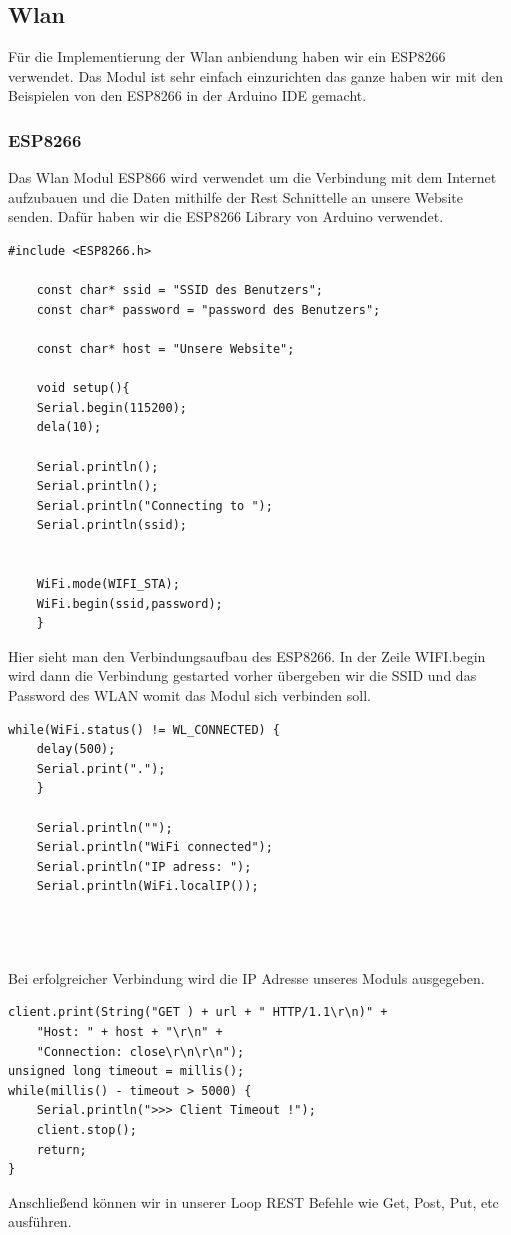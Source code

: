 \newpage
\def \currentAuthor {Florian Tipotsch}
\newpage
\subsection{Wlan}
Für die Implementierung der Wlan anbiendung haben wir ein ESP8266 verwendet. Das Modul ist sehr einfach einzurichten das ganze haben wir mit den Beispielen von den ESP8266 in der Arduino IDE gemacht.

\subsubsection{ESP8266}
Das Wlan Modul ESP866 wird verwendet um die Verbindung mit dem Internet aufzubauen und die Daten mithilfe der Rest Schnittelle an unsere Website senden. Dafür haben wir die ESP8266 Library von Arduino verwendet.\cite{esp8266}
\begin{lstlisting}[caption=Verbindungsaufbau des ESP8266]
	#include <ESP8266.h>
	
	const char* ssid = "SSID des Benutzers";
	const char* password = "password des Benutzers";
	
	const char* host = "Unsere Website";
	
	void setup(){
	Serial.begin(115200);
	dela(10);
	
	Serial.println();
	Serial.println();
	Serial.println("Connecting to ");
	Serial.println(ssid);
	
	
	WiFi.mode(WIFI_STA);
	WiFi.begin(ssid,password);
	}
\end{lstlisting}

Hier sieht man den Verbindungsaufbau des ESP8266. In der Zeile WIFI.begin wird dann die Verbindung gestarted vorher übergeben wir die SSID und das Password des WLAN womit das Modul sich verbinden soll.
\newpage
\begin{lstlisting}[caption=Verbindungsaufbau Response]
	while(WiFi.status() != WL_CONNECTED) {
	delay(500);
	Serial.print(".");
	}
	
	Serial.println("");
	Serial.println("WiFi connected");
	Serial.println("IP adress: ");
	Serial.println(WiFi.localIP());
	
	


\end{lstlisting}

Bei erfolgreicher Verbindung wird die IP Adresse unseres Moduls ausgegeben.

\begin{lstlisting}[caption=Ausführung der REST Befehle]
client.print(String("GET ) + url + " HTTP/1.1\r\n)" +
	"Host: " + host + "\r\n" + 
	"Connection: close\r\n\r\n");
unsigned long timeout = millis();
while(millis() - timeout > 5000) {
	Serial.println(">>> Client Timeout !");
	client.stop();
	return;
}
\end{lstlisting}
Anschließend können wir in unserer Loop REST Befehle wie Get, Post, Put, etc ausführen.




